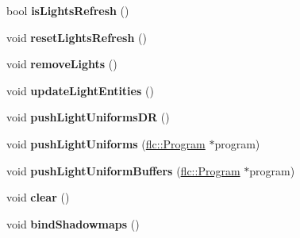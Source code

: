 \begin{DoxyCompactItemize}
\item 
\mbox{\label{classflw_1_1flf_1_1LightSystem_a7651524658ab9cb67409d2a7a3b40785}} 
bool {\bfseries is\+Lights\+Refresh} ()
\item 
\mbox{\label{classflw_1_1flf_1_1LightSystem_a88558cb8efc715a0d0af143c55266904}} 
void {\bfseries reset\+Lights\+Refresh} ()
\item 
\mbox{\label{classflw_1_1flf_1_1LightSystem_acf0550d7bd5a1e1594a3327252d4c73f}} 
void {\bfseries remove\+Lights} ()
\item 
\mbox{\label{classflw_1_1flf_1_1LightSystem_aacee6250b5bd3879a9ebd742181d9bd9}} 
void {\bfseries update\+Light\+Entities} ()
\item 
\mbox{\label{classflw_1_1flf_1_1LightSystem_aec0348329c501772f89787d1b0d145d0}} 
void {\bfseries push\+Light\+Uniforms\+DR} ()
\item 
\mbox{\label{classflw_1_1flf_1_1LightSystem_aae4432792a7c0048d0b9ce8f42c486d2}} 
void {\bfseries push\+Light\+Uniforms} (\hyperlink{classflw_1_1flc_1_1Program}{flc\+::\+Program} $\ast$program)
\item 
\mbox{\label{classflw_1_1flf_1_1LightSystem_a80af6b13ff567db8dc821fce8bd4d64f}} 
void {\bfseries push\+Light\+Uniform\+Buffers} (\hyperlink{classflw_1_1flc_1_1Program}{flc\+::\+Program} $\ast$program)
\item 
\mbox{\label{classflw_1_1flf_1_1LightSystem_a2af93a35df56344840ceeeaaca9ea1e9}} 
void {\bfseries clear} ()
\item 
\mbox{\label{classflw_1_1flf_1_1LightSystem_abe92c7226cc53a7ed44e32d74191aaf5}} 
void {\bfseries bind\+Shadowmaps} ()
\item 
\mbox{\label{classflw_1_1flf_1_1LightSystem_ab46894fd98f0ca50c2545d7c1845fb26}} 

\end{DoxyCompactItemize}
